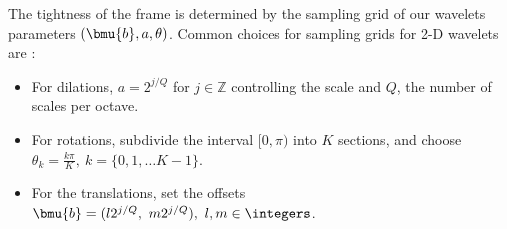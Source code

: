 The tightness of the frame is determined by the sampling grid of our wavelets
parameters $(\bmu{b}, a, \theta)$.
Common choices for sampling grids for 2-D wavelets are \cite[Section
2.2]{antoine_two-dimensional_2004}:
\begin{itemize}
  \item For dilations, $a = 2^{j/Q}$ for $j\in \mathbb{Z}$
    controlling the scale and $Q$, the number of scales per octave.
  \item For rotations, subdivide the interval $[0, \pi)$ into $K$ sections,
    and choose $\theta_k = \frac{k\pi}{K},\ k = \{0, 1, \ldots K-1\}$.
  \item For the translations, set the offsets $\bmu{b} =
    (l2^{j/Q},\ m2^{j/Q}),\ l,m \in \integers$.
\end{itemize}



%
